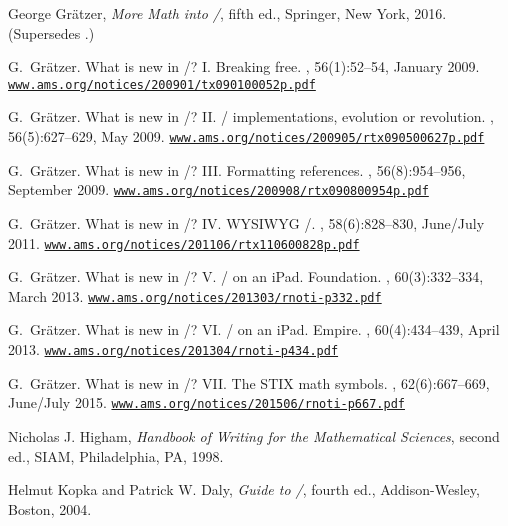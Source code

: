 \begin{thebibliography}{[ASMR]}
 George Gr\"atzer, \textit{More Math into \latex/}, fifth ed.,
Springer, New York, 2016.  (Supersedes \cite{GGr}.)

G.~Gr{\"a}tzer.
\newblock What is new in \latex/? I. Breaking free.
, 56(1):52--54, January 2009.
\href{http://www.ams.org/notices/200901/tx090100052p.pdf}{\texttt{www.ams.org/notices/200901/tx090100052p.pdf}}

G.~Gr{\"a}tzer.
\newblock What is new in \latex/? II. \tex/ implementations, evolution or
  revolution.
, 56(5):627--629, May 2009.
\href{http://www.ams.org/notices/200905/rtx090500627p.pdf}{\texttt{www.ams.org/notices/200905/rtx090500627p.pdf}}

G.~Gr{\"a}tzer.
\newblock What is new in \latex/? III. Formatting references.
, 56(8):954--956, September 2009.
\href{http://www.ams.org/notices/200908/rtx090800954p.pdf}{\texttt{www.ams.org/notices/200908/rtx090800954p.pdf}}

G.~Gr{\"a}tzer.
\newblock What is new in \latex/? IV. WYSIWYG \latex/.
, 58(6):828--830, June/July 2011.
\href{http://www.ams.org/notices/201106/rtx110600828p.pdf}{\texttt{www.ams.org/notices/201106/rtx110600828p.pdf}}

G.~Gr{\"a}tzer.
\newblock What is new in \latex/? V. \latex/ on an iPad. Foundation.
, 60(3):332--334, March 2013.
\href{http://www.ams.org/notices/201303/rnoti-p332.pdf}{\texttt{www.ams.org/notices/201303/rnoti-p332.pdf}}

G.~Gr{\"a}tzer.
\newblock What is new in \latex/? VI. \latex/ on an iPad. Empire.
, 60(4):434--439, April 2013.
\href{http://www.ams.org/notices/201304/rnoti-p434.pdf}{\texttt{www.ams.org/notices/201304/rnoti-p434.pdf}}

G.~Gr{\"a}tzer.
\newblock What is new in \latex/? VII. The STIX math symbols.
, 62(6):667--669, June/July 2015.
\href{http://www.ams.org/notices/201506/rnoti-p667.pdf}{\texttt{www.ams.org/notices/201506/rnoti-p667.pdf}}

 Nicholas J. Higham, \textit{Handbook of Writing for
the Mathematical Sciences}, second ed., SIAM, Philadelphia, PA, 1998.

 Helmut Kopka and Patrick W. Daly, \textit{Guide to \latex/},
fourth ed., Addison-Wesley, Boston, 2004.


\end{thebibliography}
